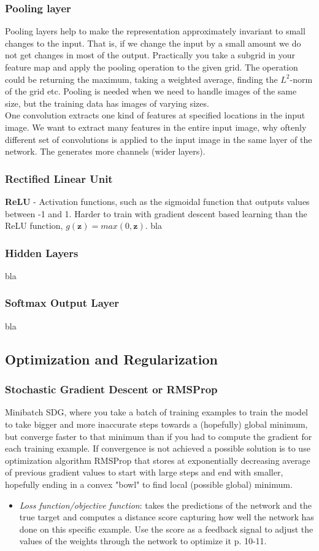 \documentclass[a4paper,11pt]{article}
\begin{document}
\subsubsection{Pooling layer}
Pooling layers help to make the representation approximately invariant to small changes to the input. That is, if we change the input by a small amount we do not get changes in most of the output. Practically you take a subgrid in your feature map and apply the pooling operation to the given grid. The operation could be returning the maximum, taking a weighted average, finding the $L^2$-norm of the grid etc. Pooling is needed when we need to handle images of the same size, but the training data has images of varying sizes.\\
One convolution extracts one kind of features at specified locations in the input image. We want to extract many features in the entire input image, why oftenly different set of convolutions is applied to the input image in the same layer of the network. The generates more channels (wider layers). \cite{Goodfellow-et-al-2016}
\subsubsection{Rectified Linear Unit}
\textbf{ReLU} - Activation functions, such as the sigmoidal function that outputs values between -1 and 1. Harder to train with gradient descent based learning than the ReLU function, $g(\textbf{z})=max(0,\textbf{z})$.
bla
\subsubsection{Hidden Layers}
bla
\subsubsection{Softmax Output Layer}
bla
\subsection{Optimization and Regularization}
\subsubsection{Stochastic Gradient Descent or RMSProp}
Minibatch SDG, where you take a batch of training examples to train the model to take bigger and more inaccurate steps towards a (hopefully) global minimum, but converge faster to that minimum than if you had to compute the gradient for each training example. If convergence is not achieved a possible solution is to use optimization algorithm RMSProp that stores at exponentially decreasing average of previous gradient values to start with large steps and end with smaller, hopefully ending in a convex "bowl" to find local (possible global) minimum.
\begin{itemize}
\item \textit{Loss function/objective function}: takes the predictions of the network and the true target and computes a distance score capturing how well the network has done on this specific example. Use the score as a feedback signal to adjust the values of the weights through the network to optimize it \cite{Chollet-et-al-2018} p. 10-11.
\end{itemize}
\end{document}
